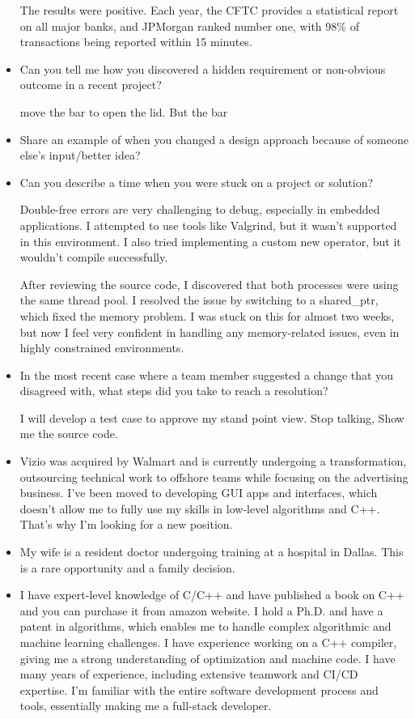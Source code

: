 \documentclass[a4paper,11pt,twoside]{book}
\begin{document}
\begin{itemize}
	The results were positive. Each year, the CFTC provides a statistical report on all major banks, and JPMorgan ranked number one, with 98\% of transactions being reported within 15 minutes.
	
	\item Can you tell me how you discovered a hidden requirement or non-obvious outcome in a recent project?
	
	move the bar to open the lid. But the bar 
	
	\item Share an example of when you changed a design approach because of someone else’s input/better idea?
	
	
	
	
	\item Can you describe a time when you were stuck on a project or solution?
	
	Double-free errors are very challenging to debug, especially in embedded applications. I attempted to use tools like Valgrind, but it wasn’t supported in this environment. I also tried implementing a custom new operator, but it wouldn’t compile successfully.
	
	After reviewing the source code, I discovered that both processes were using the same thread pool. I resolved the issue by switching to a shared\_ptr, which fixed the memory problem. I was stuck on this for almost two weeks, but now I feel very confident in handling any memory-related issues, even in highly constrained environments.
	
	
	\item In the most recent case where a team member suggested a change that you disagreed with, what steps did
	you take to reach a resolution?
	
	I will develop a test case to approve my stand point view. Stop talking, Show me the source code. 
	
	\item Vizio was acquired by Walmart and is currently undergoing a transformation, outsourcing technical work to offshore teams while focusing on the advertising business. I’ve been moved to developing GUI apps and interfaces, which doesn’t allow me to fully use my skills in low-level algorithms and C++. That’s why I’m looking for a new position.
	
	\item My wife is a resident doctor undergoing training at a hospital in Dallas. This is a rare opportunity and a family decision.
	
	\item I have expert-level knowledge of C/C++ and have published a book on C++ and you can purchase it from amazon website. I hold a Ph.D. and have a patent in algorithms, which enables me to handle complex algorithmic and machine learning challenges. I have experience working on a C++ compiler, giving me a strong understanding of optimization and machine code. I have many years of experience, including extensive teamwork and CI/CD expertise. I’m familiar with the entire software development process and tools, essentially making me a full-stack developer. 
	
	
\end{itemize}



\ifx \allfiles \undefined
\end{document}

